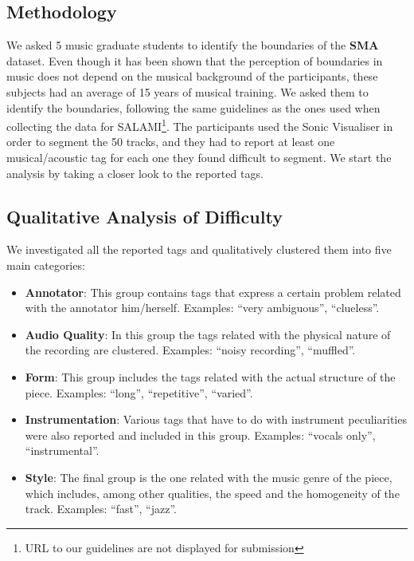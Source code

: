 \documentclass{article}
\begin{document}
\subsection{Methodology}

We asked 5 music graduate students to identify the boundaries of the \textbf{SMA} dataset.
Even though it has been shown that the perception of boundaries in music does not depend on the musical background of the participants\cite{Bruderer2009}, these subjects had an average of 15 years of musical training.
We asked them to identify the boundaries, following the same guidelines as the ones used when collecting the data for SALAMI\cite{Smith2011}\footnote{URL to our guidelines are not displayed for submission}.
The participants used the Sonic Visualiser\cite{Cannam2006} in order to segment the 50 tracks, and they had to report at least one musical/acoustic tag for each one they found difficult to segment.
We start the analysis by taking a closer look to the reported tags.

\subsection{Qualitative Analysis of Difficulty}

We investigated all the reported tags and qualitatively clustered them into five main categories:

\begin{itemize}
  \item
    \textbf{Annotator}: This group contains tags that express a certain problem related with the annotator him/herself. 
    Examples: ``very ambiguous'', ``clueless''.

  \item
    \textbf{Audio Quality}: In this group the tags related with the physical nature of the recording are clustered. 
    Examples: ``noisy recording'', ``muffled''.

  \item
    \textbf{Form}: This group includes the tags related with the actual structure of the piece. Examples: ``long'', ``repetitive'', ``varied''.

  \item
    \textbf{Instrumentation}: Various tags that have to do with instrument peculiarities were also reported and included in this group. Examples: ``vocals only'', ``instrumental''.

  \item
    \textbf{Style}: The final group is the one related with the music genre of the piece, which includes, among other qualities, the speed and the homogeneity of the track. Examples: ``fast'', ``jazz''.
\end{itemize}
\end{document}
